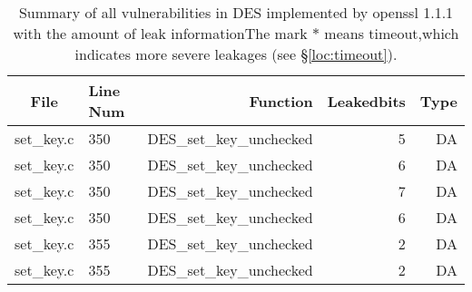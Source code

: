 \begin{table}%
\centering
\caption{Summary of all vulnerabilities in DES implemented by openssl 1.1.1 with the amount of leak informationThe mark $*$ means timeout,which indicates more severe leakages (see \S\ref{loc:timeout}).}\label{tab:DESopenssl}
\begin{tabular}{clrrr}
\hline
\textbf{File} & \textbf{Line Num} & \textbf{Function} & \textbf{Leakedbits} & \textbf{Type} \\\hline
set\_key.c& 350&DES\_set\_key\_unchecked&5 &DA\\
set\_key.c& 350&DES\_set\_key\_unchecked&6 &DA\\
set\_key.c& 350&DES\_set\_key\_unchecked&7 &DA\\
set\_key.c& 350&DES\_set\_key\_unchecked&6 &DA\\
set\_key.c& 355&DES\_set\_key\_unchecked&2 &DA\\
set\_key.c& 355&DES\_set\_key\_unchecked&2 &DA\\
\hline
\end{tabular}
\end{table}